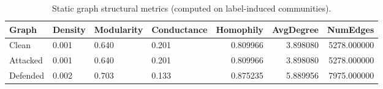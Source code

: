 \begin{table}[t]
\centering
\small
\begin{tabular}{llllrrr}
\toprule
Graph & Density & Modularity & Conductance & Homophily & AvgDegree & NumEdges \\
\midrule
Clean & 0.001 & 0.640 & 0.201 & 0.809966 & 3.898080 & 5278.000000 \\
Attacked & 0.001 & 0.640 & 0.201 & 0.809966 & 3.898080 & 5278.000000 \\
Defended & 0.002 & 0.703 & 0.133 & 0.875235 & 5.889956 & 7975.000000 \\
\bottomrule
\end{tabular}

\caption{Static graph structural metrics (computed on label-induced communities).}
\label{tab:graph_metrics_static}
\end{table}
